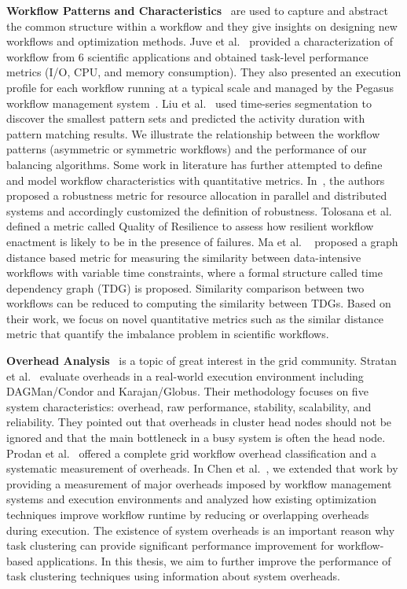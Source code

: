 \textbf{Workflow Patterns and Characteristics}~\cite{Juve2013, Liu2008} are used to capture and abstract the common structure within a workflow and they give insights on designing new workflows and optimization methods. Juve et al.~\cite{Juve2013} provided a characterization of workflow from 6 scientific applications and obtained task-level performance metrics (I/O, CPU, and memory consumption). They also presented an execution profile for each workflow running at a typical scale and managed by the Pegasus workflow management system~\cite{Deelman2005}. Liu et al.~\cite{Liu2008} used time-series segmentation to discover the smallest pattern sets and 
predicted the activity duration with pattern matching results. We illustrate the relationship between the workflow patterns (asymmetric or symmetric workflows) and the performance of our balancing algorithms. 
Some work in literature has further attempted to define and model workflow characteristics with quantitative metrics. In~\cite{Ali2004}, the authors proposed a robustness metric for resource allocation in parallel and distributed systems and accordingly customized the definition of robustness. Tolosana et al.~\cite{Tolosana2011} defined a metric called Quality of Resilience to assess how resilient workflow enactment is likely to be in the presence of failures. Ma et al. ~\cite{Ma:2014:GDB:2560969.2561388} proposed a graph distance based metric for measuring the similarity between data-intensive workflows with variable time constraints, where a formal structure called time dependency graph (TDG) is proposed. Similarity comparison between two workflows can be reduced to computing the similarity between TDGs. Based on their work, we focus on novel quantitative metrics such as the similar distance metric that quantify the imbalance problem in scientific workflows. 

\textbf{Overhead Analysis}~\cite{Ostberg2011, Prodan2008, Chen2011} is a topic of great interest in the grid community. Stratan et al.~\cite{Stratan2008} evaluate overheads in a real-world execution environment including DAGMan/Condor and Karajan/Globus. Their methodology focuses on five system characteristics: overhead, raw performance, stability, scalability, and reliability. They pointed out that overheads in cluster head nodes should not be ignored and that the main bottleneck in a busy system is often the head node. Prodan et al.~\cite{Prodan2008} offered a complete grid workflow overhead classification and a systematic measurement of overheads. In Chen et al.~\cite{Chen2011}, we extended that work by providing a measurement of major overheads imposed by workflow management systems and execution environments and analyzed how existing optimization techniques improve workflow runtime by reducing or overlapping overheads during execution. The existence of system overheads is an important reason why task clustering can provide significant performance improvement for workflow-based applications. In this thesis, we aim to further improve the performance of task clustering techniques using information about system overheads. 


